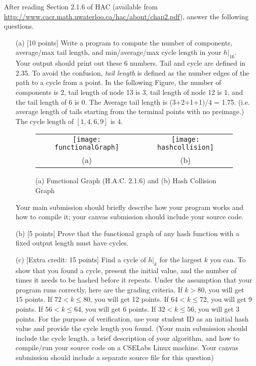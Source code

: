 \documentclass[11pt]{article}
\begin{document}
  After reading Section 2.1.6 of HAC (available from
  \url{http://www.cacr.math.uwaterloo.ca/hac/about/chap2.pdf}), answer the
  following questions.

\begin{itemize}
\item[(a)] [10 points] Write a program to compute the number of components,
    average/max tail length, and min/average/max cycle length in your
    $h|_{16}$. Your output should print out these 6 numbers.  Tail and
    cycle are defined in 2.35. To avoid the confusion, \emph{tail length} is
    defined as the number edges of the path to a cycle from a point.  In the
    following Figure, the number of components is 2, tail length of node 13 is 3,
    tail length of node 12 is 1, and the tail length of 6 is 0. The Average tail length
    is (3+2+1+1)/4 = 1.75. (i.e. average length of tails starting from the
    terminal points with no preimage.)  The cycle length of $[1, 4, 6, 9]$ is 4.

  \begin{figure}[h]
    \begin{center}
      \begin{tabular}{cc}
        \texttt{[image: functionalGraph]} & 
        \texttt{[image: hashcollision]} \\
        (a) & (b)
      \end{tabular}
      \caption{(a) Functional Graph (H.A.C. 2.1.6) and (b) Hash
        Collision Graph}
    \end{center}
  \end{figure}

  Your main submission should briefly describe how your program works
  and how to compile it; your canvas submission should include your
  source code.

\item[(b)] [5 points] Prove that the functional graph of any hash function with a fixed output
  length must have cycles.

\item[(c)] [Extra credit: 15 points] Find a cycle of $h|_k$ for the
  largest $k$ you can. To show that you found a cycle, present the
  initial value, and the number of times it needs to be hashed before
  it repeats. Under the assumption that your program runs correctly,
  here are the grading criteria. If $k>80$, you will get 15 points. If
  $72<k\leq 80$, you will get 12 points. If $64<k\leq 72$, you will
  get 9 points. If $56<k\leq 64$, you will get 6 points. If $32 <
  k\leq 56$, you will get 3 points.  For the purpose of verification,
  use your student ID as an initial hash value and provide the cycle
  length you found.  (Your main submission should include the cycle
  length, a brief description of your algorithm, and how to compile/run
  your source code on a CSELabs Linux machine.  Your canvas submission
  should include a separate source file for this question) 


\end{itemize}
\end{document}
